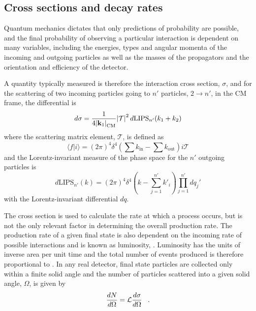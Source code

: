 \subsection{Cross sections and decay rates}

 Quantum mechanics dictates that 
  only predictions of probability are possible,
  and the final probability of observing
  a particular interaction
  is dependent on many variables, including
  the energies, types and angular momenta of the incoming
  and outgoing particles as well as
  the masses of the propagators
  and the orientation and efficiency of the detector.

 A quantity typically measured is therefore the 
  interaction cross section, $\sigma$,
  and for the scattering of two incoming 
  particles going to $n'$ particles, $2\rightarrow n'$,
  in the CM frame, the differential is
\begin{equation}\label{eq:dsigma}
 d\sigma = \frac{1}{4\abs{\mathbf{k}_1}_{\mathrm{CM}}}\abs{\mathcal{T}}^2 
  d\mathrm{LIPS}_{n'}(k_1 + k_2)
\end{equation}
  where the scattering matrix element, $\mathcal{T}$,
  is defined as %
\begin{equation}\label{eq:matrixelement}
\langle f | i \rangle = (2\pi)^4\delta^4\left(\sum k_{\mathrm{in}}-\sum k_{\mathrm{out}}\right)
  i \mathcal{T}
\end{equation}
  and the Lorentz-invariant measure of the 
  phase space for the $n'$ outgoing particles is
\begin{equation}\label{eq:dlips}
 d\mathrm{LIPS}_{n'}(k) = (2\pi)^4 \delta^4
  \left(k - \sum_{j=1}^{n'}k'_i \right )
  \prod_{j=1}^{n'}dq_j'
\end{equation}
 with the Lorentz-invariant differential $dq$.

 The cross section is used to calculate the rate
  at which a process occurs, but is
  not the only relevant factor in determining
  the overall production rate.
 The production rate of a given final state
  is also dependent on the incoming
  rate of possible interactions and is 
  known as luminosity, \lumi.
 Luminosity has the units of inverse area per unit time
  and the total number of events produced
  is therefore proportional to \tlumi.
 In any real detector, final state particles
  are collected only within a finite
  solid angle and the number of particles
  scattered into a given solid angle, $\Omega$, is given by
\begin{equation}\label{eq:lumidef}
 \frac{dN}{d\Omega} = \mathcal L \frac{d\sigma}{d\Omega}\;\;\;.
\end{equation}


